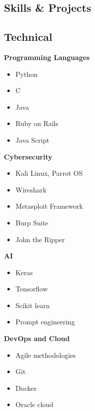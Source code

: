 \documentclass[11pt,a4paper,sans]{moderncv}        %
\begin{document}
\begin{multicols}{2}
\section{Skills \& Projects}
\subsection{Technical}

\begin{minipage}[t]{0.45\linewidth}
\textbf{Programming Languages}
\begin{itemize}
    \item Python
    \item C
    \item Java
    \item Ruby on Rails
    \item Java Script
\end{itemize}
\end{minipage}
\hfill
\begin{minipage}[t]{0.45\linewidth}
\textbf{Cybersecurity}
\begin{itemize}
    \item Kali Linux, Parrot OS
    \item Wireshark
    \item Metasploit Framework
    \item Burp Suite
    \item John the Ripper
\end{itemize}
\end{minipage}

\begin{minipage}[t]{0.45\linewidth}
\textbf{AI}
\begin{itemize}
    \item Keras
    \item Tensorflow
    \item Scikit learn
    \item Prompt engineering
\end{itemize}
\end{minipage}
\hfill
\begin{minipage}[t]{0.45\linewidth}
\textbf{DevOps and Cloud}
\begin{itemize}
    \item Agile methodologies
    \item Git
    \item Docker
    \item Oracle cloud
\end{itemize}
\end{minipage}



\end{multicols}
\end{document}
